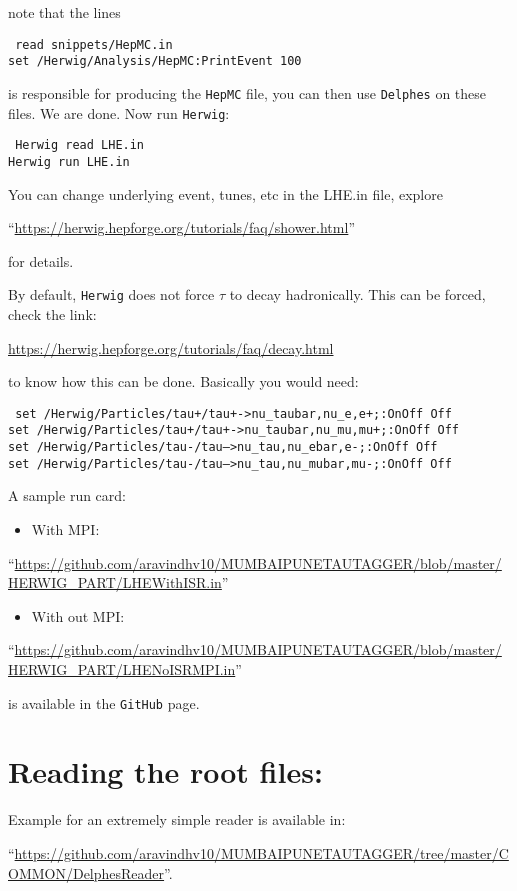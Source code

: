 note that the lines
\begin{center}
    \begin{minipage}{0.7\textwidth}
        {\tt
            read snippets/HepMC.in\\
            set /Herwig/Analysis/HepMC:PrintEvent 100
        }
    \end{minipage}
\end{center}
is responsible for producing the {\tt HepMC} file, you can then use {\tt Delphes} on these files. We are done. Now run {\tt Herwig}:
\begin{center}
    \begin{minipage}{0.7\textwidth}
        {\tt
            Herwig read LHE.in\\
            Herwig run LHE.in
        }
    \end{minipage}
\end{center}
You can change underlying event, tunes, etc in the LHE.in file, explore 
\begin{flushleft}
    ``\small{\url{https://herwig.hepforge.org/tutorials/faq/shower.html}}''
\end{flushleft}
for details.

By default, {\tt Herwig} does not force $\tau$ to decay hadronically. This can be forced, check the link: 
\begin{flushleft}
    \small{\url{https://herwig.hepforge.org/tutorials/faq/decay.html}}
\end{flushleft}
to know how this can be done. Basically you would need:
\begin{center}
    \begin{minipage}{0.8\textwidth}
        {\tt
            set /Herwig/Particles/tau+/tau+->nu\_taubar,nu\_e,e+;:OnOff Off\\
            set /Herwig/Particles/tau+/tau+->nu\_taubar,nu\_mu,mu+;:OnOff Off\\
            set /Herwig/Particles/tau-/tau-->nu\_tau,nu\_ebar,e-;:OnOff Off\\
            set /Herwig/Particles/tau-/tau-->nu\_tau,nu\_mubar,mu-;:OnOff Off
        }
    \end{minipage}
\end{center}

A sample run card:
\begin{itemize}
    \item With MPI:
\end{itemize}
\begin{flushleft}
    ``\small{\url{https://github.com/aravindhv10/MUMBAIPUNETAUTAGGER/blob/master/HERWIG_PART/LHEWithISR.in}}''
\end{flushleft}
\begin{itemize}
    \item With out MPI:
\end{itemize}
\begin{flushleft}
    ``\small{\url{https://github.com/aravindhv10/MUMBAIPUNETAUTAGGER/blob/master/HERWIG_PART/LHENoISRMPI.in}}''
\end{flushleft}
is available in the {\tt GitHub} page.

\section{Reading the root files:}
Example for an extremely simple reader is available in:
\begin{flushleft}
    ``\small{\url{https://github.com/aravindhv10/MUMBAIPUNETAUTAGGER/tree/master/COMMON/DelphesReader}}''.
\end{flushleft}
